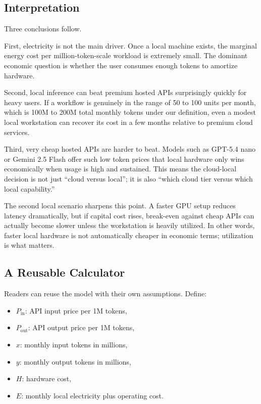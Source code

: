 \documentclass[11pt,a4paper]{article}
\begin{document}
\subsection{Interpretation}

Three conclusions follow.

First, electricity is not the main driver. Once a local machine exists, the marginal energy cost per million-token-scale workload is extremely small. The dominant economic question is whether the user consumes enough tokens to amortize hardware.

Second, local inference can beat premium hosted APIs surprisingly quickly for heavy users. If a workflow is genuinely in the range of 50 to 100 units per month, which is 100M to 200M total monthly tokens under our definition, even a modest local workstation can recover its cost in a few months relative to premium cloud services.

Third, very cheap hosted APIs are harder to beat. Models such as GPT-5.4 nano or Gemini 2.5 Flash offer such low token prices that local hardware only wins economically when usage is high and sustained. This means the cloud-local decision is not just ``cloud versus local''; it is also ``which cloud tier versus which local capability.''

The second local scenario sharpens this point. A faster GPU setup reduces latency dramatically, but if capital cost rises, break-even against cheap APIs can actually become slower unless the workstation is heavily utilized. In other words, faster local hardware is not automatically cheaper in economic terms; utilization is what matters.

\subsection{A Reusable Calculator}

Readers can reuse the model with their own assumptions. Define:
\begin{itemize}[noitemsep]
    \item $P_{\mathrm{in}}$: API input price per 1M tokens,
    \item $P_{\mathrm{out}}$: API output price per 1M tokens,
    \item $x$: monthly input tokens in millions,
    \item $y$: monthly output tokens in millions,
    \item $H$: hardware cost,
    \item $E$: monthly local electricity plus operating cost.
\end{itemize}
\end{document}
